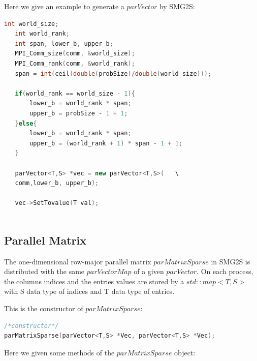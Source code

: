 \documentclass[a4paper, 10 pt]{report}
\begin{document}
	Here we give an example to generate a $parVector$ by SMG2S:
	
	\begin{lstlisting}[language=C++,frame=single]
   int world_size;
   int world_rank;
   int span, lower_b, upper_b;
   MPI_Comm_size(comm, &world_size);
   MPI_Comm_rank(comm, &world_rank);
   span = int(ceil(double(probSize)/double(world_size)));
   
   if(world_rank == world_size - 1){
       lower_b = world_rank * span;
       upper_b = probSize - 1 + 1;
   }else{
       lower_b = world_rank * span;
       upper_b = (world_rank + 1) * span - 1 + 1;
   }
   
   parVector<T,S> *vec = new parVector<T,S>(   \
   comm,lower_b, upper_b);
   
   vec->SetTovalue(T val);
   
	\end{lstlisting}
	
	\subsection{Parallel Matrix}
	
	The one-dimensional row-major parallel matrix $parMatrixSparse$ in SMG2S is distributed with the same $parVectorMap$ of a given $parVector$. On each process, the columns indices and the entries values are stored by a $std::map<T, S>$ with S data type of indices and T data type of entries.
	
	This is the constructor of $parMatrixSparse$:
	
\begin{lstlisting}[language=C++,frame=single]
/*constructor*/
parMatrixSparse(parVector<T,S> *Vec, parVector<T,S> *Vec);
\end{lstlisting}
	
	Here we given some methods of the $parMatrixSparse$ object:
	
\end{document}
